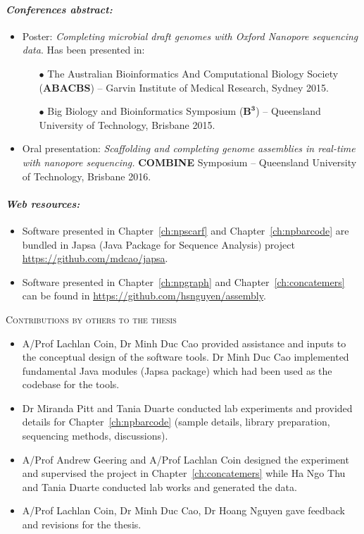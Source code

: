 \paragraph*{\textit{Conferences abstract:}}
\begin{itemize}
\item Poster: \emph{Completing microbial draft genomes with Oxford Nanopore sequencing data}.
Has been presented in:
\begin{itemize}
\item[$\bullet$] The Australian Bioinformatics And Computational Biology Society (\textbf{ABACBS}) -- Garvin Institute of Medical Research, Sydney 2015.
\item[$\bullet$] Big Biology and Bioinformatics Symposium ($\mathbf{B^3}$) -- Queensland University of Technology, Brisbane 2015.
\end{itemize}
\item Oral presentation: \emph{Scaffolding and completing genome assemblies in real-time with nanopore sequencing.} \textbf{COMBINE} Symposium -- Queensland University of Technology, Brisbane 2016. 
\end{itemize}

\paragraph*{\textit{Web resources:}}
\begin{itemize}
\item Software presented in Chapter~\ref{ch:npscarf} and Chapter~\ref{ch:npbarcode} are bundled in Japsa (Java Package for Sequence Analysis) project \url{https://github.com/mdcao/japsa}.
\item Software presented in Chapter~\ref{ch:npgraph} and Chapter~\ref{ch:concatemers} can be found in \url{https://github.com/hsnguyen/assembly}.
\end{itemize}

\begin{center}
\Large \textsc{Contributions by others to the thesis}
\end{center}
\begin{itemize}
    \item A/Prof Lachlan Coin, Dr Minh Duc Cao provided assistance and inputs to the conceptual design of the software tools. 
Dr Minh Duc Cao implemented fundamental Java modules (Japsa package) which had been used as the codebase for the tools. 
    \item Dr Miranda Pitt and Tania Duarte conducted lab experiments and provided details for Chapter~\ref{ch:npbarcode} (sample details, library preparation, sequencing methods, discussions). 
    \item A/Prof Andrew Geering and A/Prof Lachlan Coin designed the experiment and supervised the project in Chapter~\ref{ch:concatemers} while Ha Ngo Thu and Tania Duarte conducted lab works and generated the data.
    \item A/Prof Lachlan Coin, Dr Minh Duc Cao, Dr Hoang Nguyen gave feedback and revisions for the thesis.
\end{itemize}

